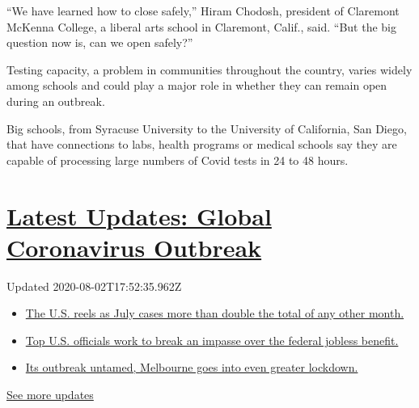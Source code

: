 ``We have learned how to close safely,'' Hiram Chodosh, president of
Claremont McKenna College, a liberal arts school in Claremont, Calif.,
said. ``But the big question now is, can we open safely?''

Testing capacity, a problem in communities throughout the country,
varies widely among schools and could play a major role in whether they
can remain open during an outbreak.

Big schools, from Syracuse University to the University of California,
San Diego, that have connections to labs, health programs or medical
schools say they are capable of processing large numbers of Covid tests
in 24 to 48 hours.

\hypertarget{latest-updates-global-coronavirus-outbreak}{%
\section{\texorpdfstring{\href{https://www.nytimes3xbfgragh.onion/2020/08/01/world/coronavirus-covid-19.html?action=click\&pgtype=Article\&state=default\&region=MAIN_CONTENT_1\&context=storylines_live_updates}{Latest
Updates: Global Coronavirus
Outbreak}}{Latest Updates: Global Coronavirus Outbreak}}\label{latest-updates-global-coronavirus-outbreak}}

Updated 2020-08-02T17:52:35.962Z

\begin{itemize}
\tightlist
\item
  \href{https://www.nytimes3xbfgragh.onion/2020/08/01/world/coronavirus-covid-19.html?action=click\&pgtype=Article\&state=default\&region=MAIN_CONTENT_1\&context=storylines_live_updates\#link-34047410}{The
  U.S. reels as July cases more than double the total of any other
  month.}
\item
  \href{https://www.nytimes3xbfgragh.onion/2020/08/01/world/coronavirus-covid-19.html?action=click\&pgtype=Article\&state=default\&region=MAIN_CONTENT_1\&context=storylines_live_updates\#link-780ec966}{Top
  U.S. officials work to break an impasse over the federal jobless
  benefit.}
\item
  \href{https://www.nytimes3xbfgragh.onion/2020/08/01/world/coronavirus-covid-19.html?action=click\&pgtype=Article\&state=default\&region=MAIN_CONTENT_1\&context=storylines_live_updates\#link-2bc8948}{Its
  outbreak untamed, Melbourne goes into even greater lockdown.}
\end{itemize}

\href{https://www.nytimes3xbfgragh.onion/2020/08/01/world/coronavirus-covid-19.html?action=click\&pgtype=Article\&state=default\&region=MAIN_CONTENT_1\&context=storylines_live_updates}{See
more updates}

